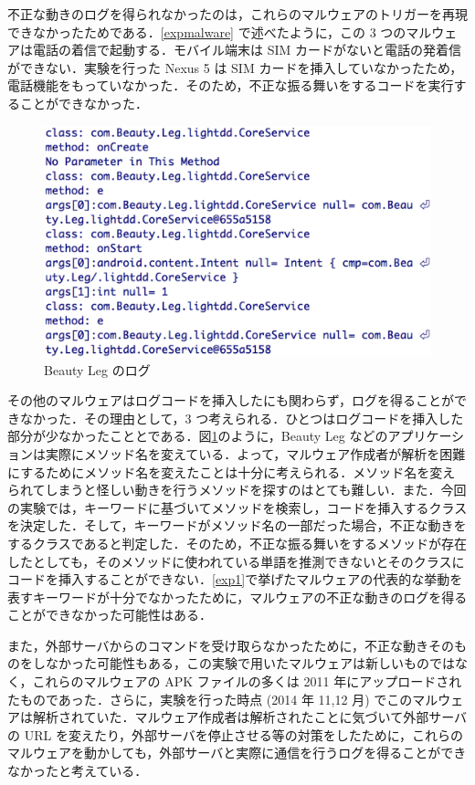 不正な動きのログを得られなかったのは，これらのマルウェアのトリガーを再現できなかったためである．\ref{expmalware} で述べたように，この 3 つのマルウェアは電話の着信で起動する．モバイル端末は SIM カードがないと電話の発着信ができない．実験を行った Nexus 5 は SIM カードを挿入していなかったため，電話機能をもっていなかった．そのため，不正な振る舞いをするコードを実行することができなかった．

\begin{figure}[t]
\begin{center}
\graphicspath{{./epsfiles/}}
\includegraphics[scale=0.25]{beautyleg2.eps}
\end{center}
\caption{Beauty Leg のログ}
\label{leg}
\end{figure}

その他のマルウェアはログコードを挿入したにも関わらず，ログを得ることができなかった．その理由として，3 つ考えられる．ひとつはログコードを挿入した部分が少なかったこととである．図\ref{leg}のように，Beauty Leg などのアプリケーションは実際にメソッド名を変えている．よって，マルウェア作成者が解析を困難にするためにメソッド名を変えたことは十分に考えられる．メソッド名を変えられてしまうと怪しい動きを行うメソッドを探すのはとても難しい．また．今回の実験では，キーワードに基づいてメソッドを検索し，コードを挿入するクラスを決定した．そして，キーワードがメソッド名の一部だった場合，不正な動きをするクラスであると判定した．そのため，不正な振る舞いをするメソッドが存在したとしても，そのメソッドに使われている単語を推測できないとそのクラスにコードを挿入することができない．\ref{exp1}で挙げたマルウェアの代表的な挙動を表すキーワードが十分でなかったために，マルウェアの不正な動きのログを得ることができなかった可能性はある．

また，外部サーバからのコマンドを受け取らなかったために，不正な動きそのものをしなかった可能性もある，この実験で用いたマルウェアは新しいものではなく，これらのマルウェアの APK ファイルの多くは 2011 年にアップロードされたものであった\cite{malwaresite}．さらに，実験を行った時点 (2014 年 11,12 月) でこのマルウェアは解析されていた．マルウェア作成者は解析されたことに気づいて外部サーバの URL を変えたり，外部サーバを停止させる等の対策をしたために，これらのマルウェアを動かしても，外部サーバと実際に通信を行うログを得ることができなかったと考えている．

